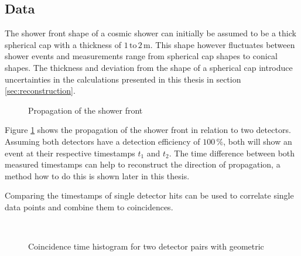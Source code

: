 \documentclass[abstract,toc,los,lof,english,10pt,glossary,acronyms]{jluthesis}
\begin{document}
\subsection{Data}
The shower front shape of a cosmic shower can initially be assumed to be a thick spherical cap with a thickness of $1\,\text{to}\,2\,\text{m}$\cite{grapes-3-2019}. This shape however fluctuates between shower events and measurements range from spherical cap shapes\cite{chitnis-2002} to conical shapes\cite{grapes-3-2019}. The thickness and deviation from the shape of a spherical cap introduce uncertainties in the calculations presented in this thesis in section \ref{sec:reconstruction}.
\begin{figure}[ht!]
	\centering
	\caption{Propagation of the shower front}
	\label{fig:data-shape}
\end{figure}
Figure \ref{fig:data-shape} shows the propagation of the shower front in relation to two detectors. Assuming both detectors have a detection efficiency of $100\,\%$, both will show an event at their respective timestamps $t_1$ and $t_2$. The time difference between both measured timestamps can help to reconstruct the direction of propagation, a method how to do this is shown later in this thesis.

Comparing the timestamps of single detector hits can be used to correlate single data points and combine them to coincidences.

\begin{figure}[ht!]
	\centering
	 \\
	\caption{Coincidence time histogram for two detector pairs with geometric}
\end{figure}
\end{document}
